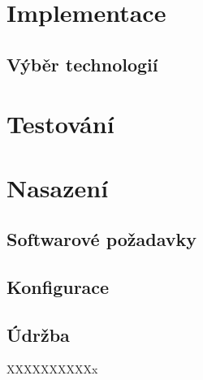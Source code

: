 \documentclass[thesis=B,czech]{FITthesis}[2012/06/26]
\begin{document}

\chapter{Implementace}

\section{Výběr technologií}



\chapter{Testování}


\chapter{Nasazení}


\section{Softwarové požadavky}

\section{Konfigurace}

\section{Údržba}

XXXXXXXXXXx \cite{JJ92}

\end{document}
